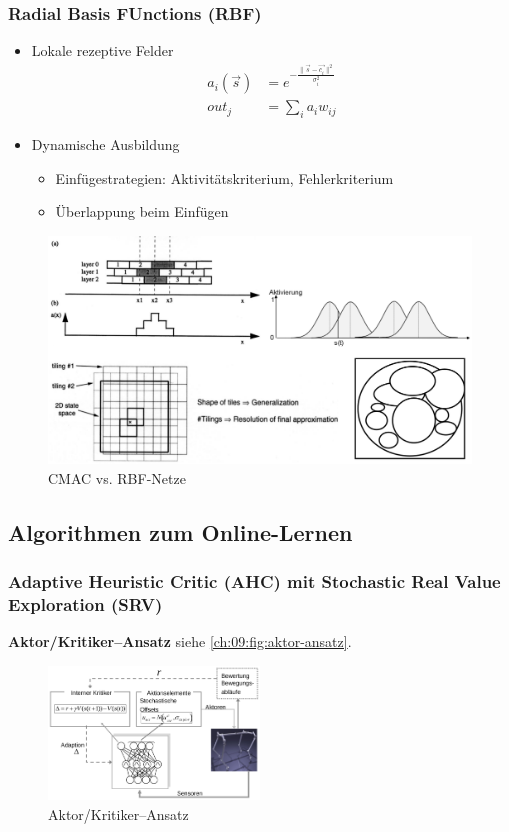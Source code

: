 \subsubsection{Radial Basis FUnctions (RBF)}
\begin{itemize}
	\item Lokale rezeptive Felder
	\begin{align}
		a_i(\overset{\rightarrow}{s}) &= e^{- \frac{\parallel \overset{\rightarrow}{s} -  \overset{\rightarrow} {c_i}\parallel^2}{\sigma_i^2}} \\
		out_j &= \sum_i a_i w_{ij}
	\end{align}
	\item Dynamische Ausbildung
	\begin{itemize}
		\item Einfügestrategien: Aktivitätskriterium, Fehlerkriterium
		\item Überlappung beim Einfügen
	\end{itemize}
\end{itemize}
\begin{figure}
	\centering
	\includegraphics[width=\textwidth]{figures/rbf_vs_cmac.png}
	\caption{CMAC vs. RBF-Netze}
	\label{ch:09:fig:cmac-vs-rbf}
\end{figure}

\subsection{Algorithmen zum Online-Lernen}

\subsubsection{Adaptive Heuristic Critic (AHC) mit Stochastic Real Value Exploration (SRV)}

\textbf{Aktor/Kritiker--Ansatz} siehe \autoref{ch:09:fig:aktor-ansatz}.
\begin{figure}[H]
	\centering
	\includegraphics[width=0.5\textwidth]{figures/kritiker_ansatz.png}
	\caption{Aktor/Kritiker--Ansatz}
	\label{ch:09:fig:aktor-ansatz}
\end{figure}

